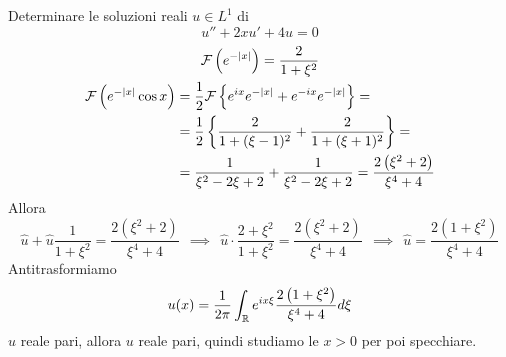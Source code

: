 Determinare le soluzioni reali $u\in L^{1}$ di
\begin{equation*}
u'' + 2xu' + 4u = 0
\end{equation*}
\ParteSoluzioni
\Soluzione
\begin{gather*}
\mathcal{F} \left(e^{- | x|}\right) = \frac{2}{1 + \xi^{2}}\\
\begin{aligned}
\mathcal{F} \left(e^{- | x|}\cos x\right) & = \frac{1}{2}\mathcal{F} \left\{e^{ix} e^{- | x|} + e^{- ix} e^{- | x|}\right\} = \\
 & = \frac{1}{2}\left\{\frac{2}{1 + (\xi - 1)^{2}} + \frac{2}{1 + (\xi + 1)^{2}}\right\} = \\
 & = \frac{1}{\xi^{2} - 2\xi + 2} + \frac{1}{\xi^{2} - 2\xi + 2} = \frac{2\left(\xi^{2} + 2\right)}{\xi^{4} + 4}
\end{aligned}
\end{gather*}
Allora
\begin{equation*}
\hat{u} + \hat{u}\frac{1}{1 + \xi^{2}} = \frac{2\left(\xi^{2} + 2\right)}{\xi^{4} + 4} \ \ \implies \ \ \hat{u} \cdot \frac{2 + \xi^{2}}{1 + \xi^{2}} = \frac{2\left(\xi^{2} + 2\right)}{\xi^{4} + 4} \ \ \implies \ \ \hat{u} = \frac{2\left(1 + \xi^{2}\right)}{\xi^{4} + 4}
\end{equation*}
Antitrasformiamo
\begin{equation*}
u(x) = \frac{1}{2\pi}\int_{\mathbb{R}} e^{ix\xi}\frac{2\left(1 + \xi^{2}\right)}{\xi^{4} + 4} d\xi
\end{equation*}
$\hat{u}$ reale pari, allora $u$ reale pari, quindi studiamo le $x > 0$ per poi specchiare.

